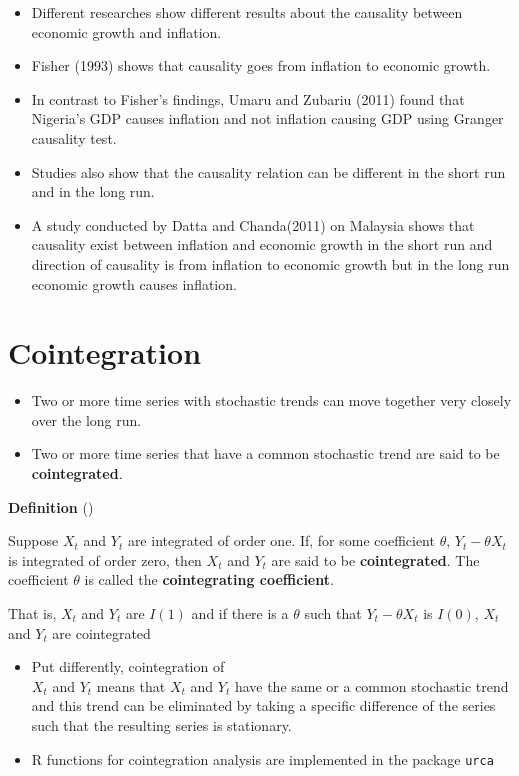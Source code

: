 \documentclass[]{book}
\providecommand{\tightlist}{%
  \setlength{\itemsep}{0pt}\setlength{\parskip}{0pt}}
\begin{document}
\begin{itemize}
\tightlist
\item
  Different researches show different results about the causality between economic growth and inflation.
\item
  Fisher (1993) shows that causality goes from inflation to economic growth.
\item
  In contrast to Fisher's findings, Umaru and Zubariu (2011) found that Nigeria's GDP causes inflation and not inflation causing GDP using Granger causality test.
\item
  Studies also show that the causality relation can be different in the short run and in the long run.
\item
  A study conducted by Datta and Chanda(2011) on Malaysia shows that causality exist between inflation and economic growth in the short run and direction of causality is from inflation to economic growth but in the long run economic growth causes inflation.
\end{itemize}

\hypertarget{cointegration}{%
\section{Cointegration}\label{cointegration}}

\begin{itemize}
\tightlist
\item
  Two or more time series with stochastic trends can move together very closely over the long run.
\item
  Two or more time series that have a common stochastic trend are said to be \textbf{cointegrated}.
\end{itemize}

\textbf{Definition} (\citet{stock2015introduction})

Suppose \(X_t\) and \(Y_t\) are integrated of order one. If, for some coefficient \(\theta\), \(Y_t-\theta X_t\) is integrated of order zero, then \(X_t\) and \(Y_t\) are said to be \textbf{cointegrated}. The coefficient \(\theta\) is called the \textbf{cointegrating coefficient}.

That is, \(X_t\) and \(Y_t\) are \(I(1)\) and if there is a \(\theta\) such that \(Y_t-\theta X_t\) is \(I(0)\), \(X_t\) and \(Y_t\) are cointegrated

\begin{itemize}
\item
  Put differently, cointegration of\\
  \(X_t\) and \(Y_t\) means that \(X_t\) and \(Y_t\) have the same or a common stochastic trend and this trend can be eliminated by taking a specific difference of the series such that the resulting series is stationary.
\item
  R functions for cointegration analysis are implemented in the package \texttt{urca}
\end{itemize}
\end{document}
